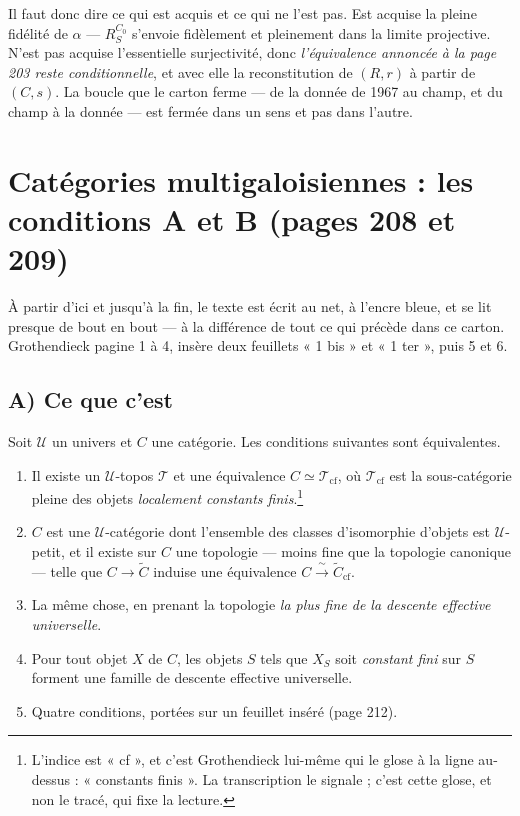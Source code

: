 \documentclass[11pt,a4paper]{article}
\begin{document}
Il faut donc dire ce qui est acquis et ce qui ne l'est pas. Est acquise la
pleine fidélité de $\alpha$ --- $R_{S}^{C_{0}}$ s'envoie fidèlement et
pleinement dans la limite projective. N'est pas acquise l'essentielle
surjectivité, donc \emph{l'équivalence annoncée à la page 203 reste
conditionnelle}, et avec elle la reconstitution de $(R, r)$ à partir de
$(C, s)$. La boucle que le carton ferme --- de la donnée de 1967 au champ, et
du champ à la donnée --- est fermée dans un sens et pas dans l'autre.

\section*{Catégories multigaloisiennes : les conditions A et B (pages 208 et 209)}

À partir d'ici et jusqu'à la fin, le texte est écrit au net, à l'encre bleue,
et se lit presque de bout en bout --- à la différence de tout ce qui précède
dans ce carton. Grothendieck pagine 1 à 4, insère deux feuillets « 1 bis » et
« 1 ter », puis 5 et 6.

\subsection*{A) Ce que c'est}

Soit $\mathcal{U}$ un univers et $C$ une catégorie. Les conditions suivantes
sont équivalentes.

\begin{enumerate}
  \item[(i)] Il existe un $\mathcal{U}$-topos $\mathcal{T}$ et une équivalence
    $C \simeq \mathcal{T}_{\mathrm{cf}}$, où $\mathcal{T}_{\mathrm{cf}}$ est la
    sous-catégorie pleine des objets \emph{localement constants
    finis}.\footnote{L'indice est « cf », et c'est Grothendieck lui-même qui le
    glose à la ligne au-dessus : « constants finis ». La transcription le
    signale ; c'est cette glose, et non le tracé, qui fixe la lecture.}
  \item[(ii)] $C$ est une $\mathcal{U}$-catégorie dont l'ensemble des classes
    d'isomorphie d'objets est $\mathcal{U}$-petit, et il existe sur $C$ une
    topologie --- moins fine que la topologie canonique --- telle que
    $C \to \tilde{C}$ induise une équivalence
    $C \xrightarrow{\ \sim\ } \tilde{C}_{\mathrm{cf}}$.
  \item[(ii bis)] La même chose, en prenant la topologie \emph{la plus fine de
    la descente effective universelle}.
  \item[(iii)] Pour tout objet $X$ de $C$, les objets $S$ tels que $X_{S}$ soit
    \emph{constant fini} sur $S$ forment une famille de descente effective
    universelle.
  \item[(iv)] Quatre conditions, portées sur un feuillet inséré (page 212).
\end{enumerate}
\end{document}
